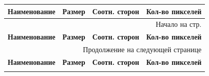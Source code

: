 \begin{VKRlongtable}
	\caption{Перечень стандартных размеров экрана}\label{tbl:screensize}
	\begin{longtable}{|l|c|c|c|}
		
		\if 0 
		
			\hline
			\textbf{Наименование} & 
			\textbf{Размер} &
			\textbf{ Соотн. сторон} & 
			\textbf{Кол-во пикселей} \\ 
			\hline \endfirsthead
			
			\hline 
			\multicolumn{4}{|r|}{Начало на стр. \pageref{tbl:screensize}}  \\
			\hline \textbf{Наименование} & 
			\textbf{Размер} &
			\textbf{ Соотн. сторон} & 
			\textbf{Кол-во пикселей} \\ 
			\hline \endhead
			
			\hline 
			\multicolumn{4}{|r|}{Продолжение на следующей странице}  \\ 
			\hline \endfoot
			
			\hline  \endlastfoot		
		\fi
		
		\hline 
			\centering\textbf{Наименование} & 
			\textbf{Размер} &
			\textbf{Соотн. сторон} & 
			\textbf{Кол-во пикселей} \\ 
		\hline \endhead
		
		\hline \endfoot
				

\end{longtable}
\end{VKRlongtable}
